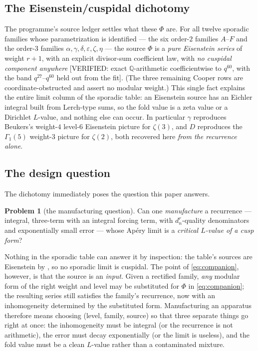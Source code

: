 \documentclass[11pt,reqno]{amsart}
\theoremstyle{plain}
\theoremstyle{definition}
\newtheorem{problem}[theorem]{Problem}
\theoremstyle{remark}
\newcommand{\Q}{\mathbb{Q}}
\newcommand{\VerifiedR}[1]{\textup{\textsf{[VERIFIED: #1]}}}
\begin{document}
\subsection{The Eisenstein/cuspidal dichotomy}
The programme's source ledger \cite{philedger} settles what these
$\Phi$ are. For all twelve sporadic families whose parametrization is
identified --- the six order-$2$ families $A$--$F$ and the order-$3$
families $\alpha,\gamma,\delta,\varepsilon,\zeta,\eta$ --- the source
$\Phi$ is a \emph{pure Eisenstein series} of weight $r+1$, with an explicit
divisor-sum coefficient law, with \emph{no cuspidal component anywhere}
\VerifiedR{exact $\Q$-arithmetic coefficientwise to $q^{60}$, with the band
$q^{27}$--$q^{60}$ held out from the fit}. (The three remaining Cooper rows
are coordinate-obstructed and assert no modular weight.) This single fact
explains the entire limit column of the sporadic table: an Eisenstein
source has an Eichler integral built from Lerch-type sums, so the fold
value is a zeta value or a Dirichlet $L$-value, and nothing else can occur.
In particular $\gamma$ reproduces Beukers's weight-$4$ level-$6$ Eisenstein
picture for $\zeta(3)$, and $D$ reproduces the $\Gamma_1(5)$ weight-$3$
picture for $\zeta(2)$, both recovered here \emph{from the recurrence
alone}.

\subsection{The design question}
The dichotomy immediately poses the question this paper answers.

\begin{problem}[the manufacturing question]\label{prob:design}
Can one \emph{manufacture} a recurrence --- integral, three-term with an
integral forcing term, with $d_n^r$-quality denominators and exponentially
small error --- whose Ap\'ery limit is a \emph{critical $L$-value of a cusp
form}?
\end{problem}

Nothing in the sporadic table can answer it by inspection: the table's
sources are Eisenstein by \cite{philedger}, so no sporadic limit is
cuspidal. The point of \eqref{eq:companion}, however, is that the source is
an \emph{input}. Given a rectified family, \emph{any} modular form of the
right weight and level may be substituted for $\Phi$ in
\eqref{eq:companion}; the resulting series still satisfies the family's
recurrence, now with an inhomogeneity determined by the substituted form.
Manufacturing an apparatus therefore means choosing (level, family,
source) so that three separate things go right at once: the inhomogeneity
must be integral (or the recurrence is not arithmetic), the error must
decay exponentially (or the limit is useless), and the fold value must be a
clean $L$-value rather than a contaminated mixture.
\end{document}
